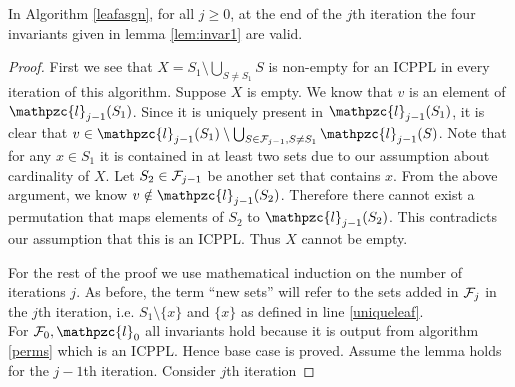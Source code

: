 \documentclass{fsttcs}
\def\cF{{\cal F}}
\def\cl{\mathpzc{l}}
\begin{document}
\begin{lemma}
\label{lem:invar3}
In Algorithm \ref{leafasgn}, for all $j \geq 0$, at the end of the
$j$th iteration the four invariants given in lemma \ref{lem:invar1}
are valid.  
\end{lemma}
\begin{proof}
  First we see that $X = S_1 \setminus \bigcup_{S \ne S_1}S$ is
  non-empty for an ICPPL in every iteration of this algorithm. Suppose
  $X$ is empty. We know that $v$ is an element of
  $\cl_{j-1}(S_1)$. Since it is uniquely present in $\cl_{j-1}(S_1)$,
  it is clear that $v \in \cl_{j-1}(S_1) \setminus \bigcup_{S \in
    \cF_{j-1}, S \ne S_1}\cl_{j-1}(S)$.  Note that for any $x \in S_1$
  it is contained in at least two sets due to our assumption about
  cardinality of $X$. Let $S_2 \in \cF_{j-1}$ be another set that
  contains $x$. From the above argument, we know $v \notin
  \cl_{j-1}(S_2)$. Therefore there cannot exist a
  permutation that maps elements of $S_2$ to $\cl_{j-1}(S_2)$. This
  contradicts our assumption that this is an ICPPL. Thus $X$ cannot be
  empty.

  \noindent
  For the rest of the proof we use mathematical induction on the
  number of iterations $j$. As before, the term ``new sets'' will
  refer to the sets added in $\cF_j$ in the $j$th iteration, i.e. $S_1
  \setminus \{x\}$ and $\{x\}$ as defined in line \ref{uniqueleaf}.\\
  For $\cF_0, \cl_0$ all invariants hold because it is output from
  algorithm \ref{perms} which is an ICPPL. Hence base case is proved.
  Assume the lemma holds for the $j-1$th iteration. Consider $j$th
  iteration 


\end{proof}
\end{document}
